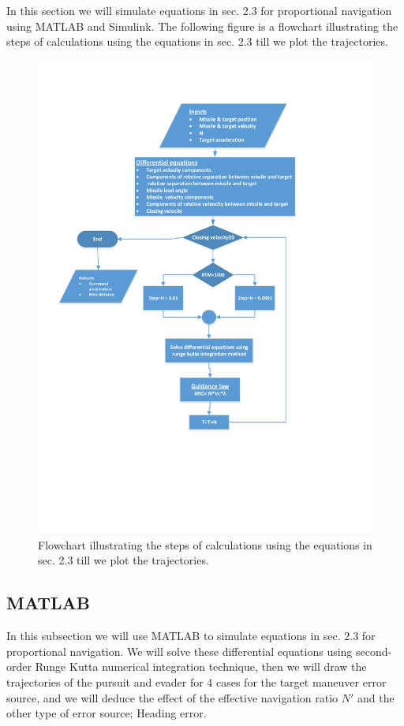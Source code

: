 In this section we will simulate equations in sec. 2.3 for proportional navigation using MATLAB and Simulink.
The following figure is a flowchart illustrating the steps of calculations using the equations in sec. 2.3  till we plot the trajectories.

\begin{figure}[htb]
	\centering
	\includegraphics[scale = 0.85]{fig/FlowchartPN.pdf}
	\caption{Flowchart illustrating the steps of calculations using the equations in sec. 2.3  till we plot the trajectories.}
	\label{flowchart PN}
\end{figure}


\subsection{MATLAB}
In this subsection we will use MATLAB to simulate equations in sec. 2.3 for proportional navigation. We will solve these differential equations using second-order Runge Kutta numerical integration technique, then we will draw the trajectories of the pursuit and evader for 4 cases for the target maneuver error source, and we will deduce the effect of the effective navigation ratio $N'$ and the other type of error source; Heading error. 
